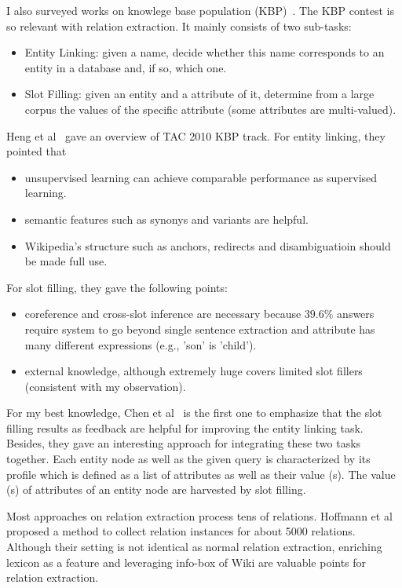 \documentclass[10pt]{article} %
\theoremstyle{definition}
\theoremstyle{definition}
\begin{document}
I also surveyed works on knowlege base population (KBP)~\cite{overviewkbp10, kbp12nyu, cunvkbp10}. 
The KBP contest is so relevant with relation extraction. 
It mainly consists of two sub-tasks:
\begin{itemize}
\item Entity Linking: given a name, decide whether this name corresponds to an entity in a database and, if so, which one. 
\item Slot Filling: given an entity and a attribute of it, determine from a large corpus the values of the specific attribute (some attributes are multi-valued). 
\end{itemize}
Heng et al~\cite{overviewkbp10} gave an overview of TAC 2010 KBP track. 
For entity linking, they pointed that 
\begin{itemize}
\item unsupervised learning can achieve comparable performance as supervised learning. 
\item semantic features such as synonys and variants are helpful. 
\item Wikipedia's structure such as anchors, redirects and disambiguatioin should be made full use. 
\end{itemize}
For slot filling, they gave the following points:
\begin{itemize}
\item coreference and cross-slot inference are necessary because $39.6\%$ answers require system to go beyond single sentence extraction and attribute has many different expressions (e.g., 'son' is 'child'). 
\item external knowledge, although extremely huge covers limited slot fillers (consistent with my observation). 
\end{itemize}
For my best knowledge, Chen et al~\cite{cunykbp10} is the first one to emphasize that 
the slot filling results as feedback are helpful for improving the entity linking task. 
Besides, they gave an interesting approach for integrating these two tasks together. 
Each entity node as well as the given query is characterized by its profile which is defined as 
a list of attributes as well as their value (s).
The value (s) of attributes of an entity node are harvested by slot filling. 



Most approaches on relation extraction process tens of relations. 
Hoffmann et al~\cite{learn5000} proposed a method to collect relation instances for about 5000 relations. 
Although their setting is not identical as normal relation extraction, enriching lexicon as a feature and 
leveraging info-box of Wiki are valuable points for relation extraction. 
\end{document}
